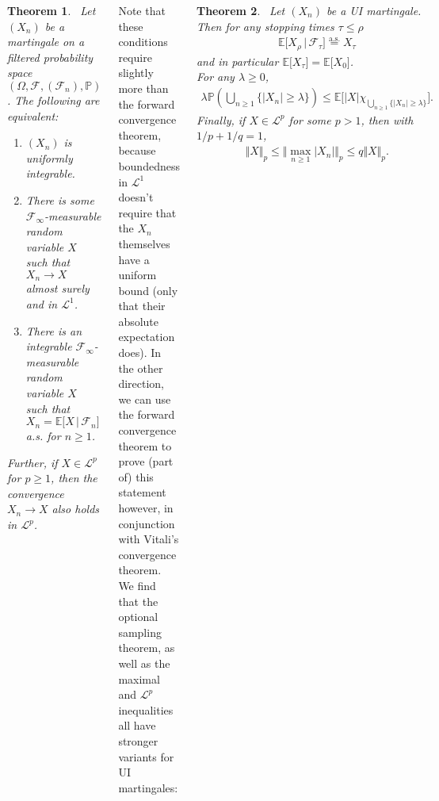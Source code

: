 \documentclass{tikzposter} %
\newtheorem{theorem}{Theorem}
\begin{document}
\begin{columns}
{    \begin{theorem}
    \ Let $(X_{n})$ be a martingale on a filtered probability space $(\Omega, \mathcal{F}, (\mathcal{F}_{n}), \mathbb{P})$. The following are equivalent:
    \begin{enumerate}[label=\roman*.]
            \item $(X_{n})$ is uniformly integrable.
            \item There is some $\mathcal{F}_{\infty}$-measurable random variable $X$ such that $X_{n} \to X$ almost surely and in $\mathcal{L}^{1}$.
            \item There is an integrable $\mathcal{F}_{\infty}$-measurable random variable $X$ such that $X_{n} = \mathbb{E}\big[X \,|\, \mathcal{F}_{n}\big]$ a.s. for $n \ge 1$.
    \end{enumerate}
    Further, if $X \in \mathcal{L}^{p}$ for $p \ge 1$, then the convergence $X_{n} \to X$ also holds in $\mathcal{L}^{p}$.
    \end{theorem}
    \hphantom{}

    Note that these conditions require slightly more than the forward convergence theorem, because boundedness in $\mathcal{L}^{1}$ doesn't require that the $X_{n}$ themselves have a uniform bound (only that their absolute expectation does). In the other direction, we can use the forward convergence theorem to prove (part of) this statement however, in conjunction with Vitali's convergence theorem. \\

    We find that the optional sampling theorem, as well as the maximal and $\mathcal{L}^{p}$ inequalities all have stronger variants for UI martingales:
    \begin{theorem}
    \ Let $(X_{n})$ be a UI martingale. Then for any stopping times $\tau \le \rho$
    \begin{align*}
      \mathbb{E}\big[X_{\rho} \,|\, \mathcal{F}_{\tau}\big] \overset{\mathrm{a.s.}}{=} X_{\tau}
    \end{align*}
    and in particular $\mathbb{E}\big[X_{\tau}\big] = \mathbb{E}\big[X_{0}\big]$. \\

    For any $\lambda \ge 0$,
    \begin{align*}
      \lambda \mathbb{P}\left(\bigcup_{n \ge 1} \{|X_{n}| \ge \lambda\}\right) \le \mathbb{E}\big[|X|\chi_{\bigcup_{n \ge 1} \{|X_{n}| \ge \lambda\}}\big].
    \end{align*}
    Finally, if $X \in \mathcal{L}^{p}$ for some $p > 1$, then with $1/p+1/q = 1$,
    \begin{align*}
      \Vert X \Vert_{p} \le \Vert \max_{n \ge 1} |X_{n}| \Vert_{p} \le q \Vert X \Vert_{p}.
    \end{align*}
    \end{theorem}
    \hphantom{}

}
\end{columns}
\end{document}
